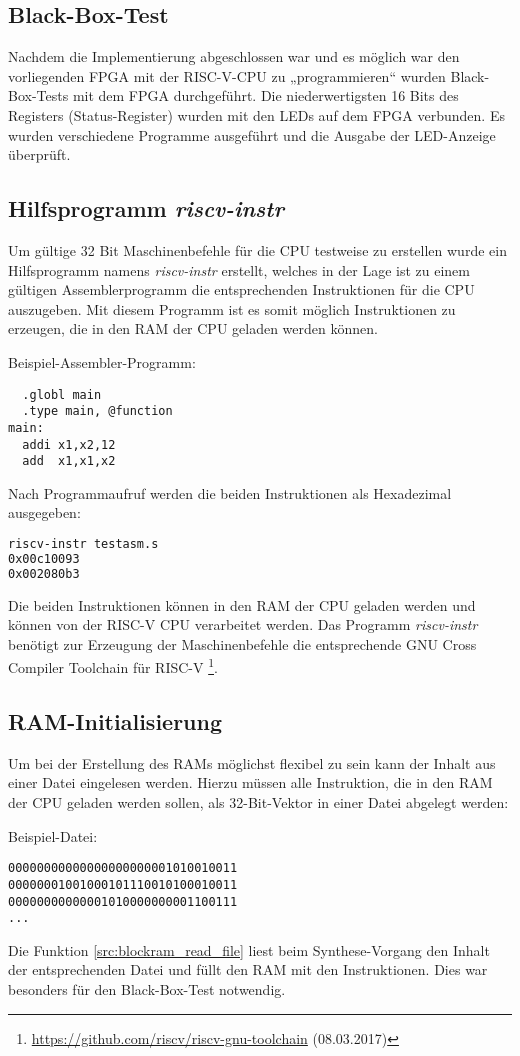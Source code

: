 \subsection{Black-Box-Test}
Nachdem die Implementierung abgeschlossen war und es möglich war den
vorliegenden FPGA mit der RISC-V-CPU zu „programmieren“ wurden
Black-Box-Tests mit dem FPGA durchgeführt. Die niederwertigsten 16 Bits
des Registers  (Status-Register) wurden mit den LEDs auf dem FPGA verbunden. Es
wurden verschiedene Programme ausgeführt und die Ausgabe der LED-Anzeige
überprüft.

\subsection{Hilfsprogramm \emph{riscv-instr}}
Um gültige 32 Bit Maschinenbefehle für die CPU testweise zu erstellen
wurde ein Hilfsprogramm namens \emph{riscv-instr} erstellt, welches in
der Lage ist zu einem gültigen Assemblerprogramm die entsprechenden
Instruktionen für die CPU auszugeben. Mit diesem Programm ist es somit
möglich Instruktionen zu erzeugen, die in den RAM der CPU geladen werden
können.

Beispiel-Assembler-Programm:
\begin{lstlisting}
  .globl main
  .type main, @function
main:
  addi x1,x2,12 
  add  x1,x1,x2
\end{lstlisting}

Nach Programmaufruf werden die beiden Instruktionen als Hexadezimal
ausgegeben:
\begin{lstlisting}[language=bash]
riscv-instr testasm.s
0x00c10093 
0x002080b3 
\end{lstlisting}
Die beiden Instruktionen können in den RAM der CPU geladen werden und
können von der RISC-V CPU verarbeitet werden. Das Programm
\emph{riscv-instr} benötigt zur Erzeugung der Maschinenbefehle die 
entsprechende GNU Cross Compiler Toolchain für RISC-V
\footnote{\url{https://github.com/riscv/riscv-gnu-toolchain}
(08.03.2017)}. 

\subsection{RAM-Initialisierung}
Um bei der Erstellung des RAMs möglichst flexibel zu sein kann der
Inhalt aus einer Datei eingelesen werden. \cite[S. 187]{XST}
Hierzu müssen alle Instruktion, die in den RAM der CPU geladen werden
sollen, als 32-Bit-Vektor in einer Datei abgelegt werden:

Beispiel-Datei:
\begin{lstlisting}
00000000000000000000001010010011
00000001001000101110010100010011
00000000000001010000000001100111
...
\end{lstlisting}

Die Funktion \ref{src:blockram_read_file} liest beim Synthese-Vorgang
den Inhalt der entsprechenden Datei und füllt den RAM mit den
Instruktionen. Dies war besonders für den Black-Box-Test notwendig.
